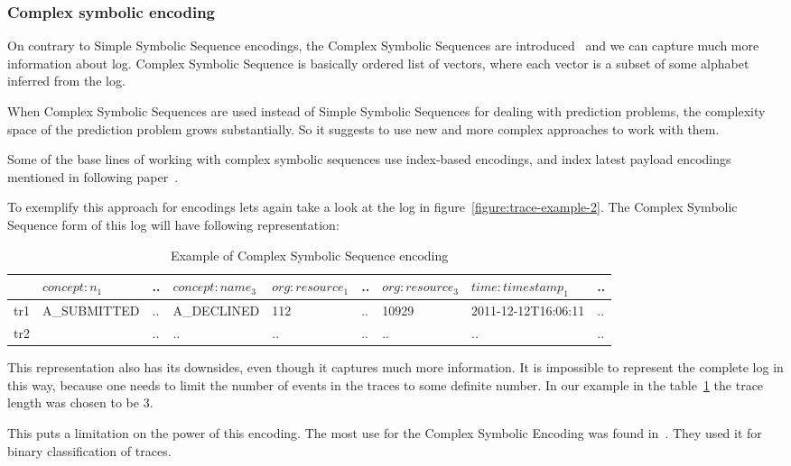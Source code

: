 \subsubsection{Complex symbolic encoding}

On contrary to Simple Symbolic Sequence encodings, the Complex Symbolic Sequences are introduced~\cite{Leontjeva2015} and we can capture much more information about log. Complex Symbolic Sequence is basically ordered list of vectors, where each vector is a subset of some alphabet inferred from the log.

When Complex Symbolic Sequences are used instead of Simple Symbolic Sequences for dealing with prediction problems, the complexity space of the prediction problem grows substantially. So it suggests to use new and more complex approaches to work with them.

Some of the base lines of working with complex symbolic sequences use index-based encodings, and index latest payload encodings mentioned in following paper~\cite{Leontjeva2015}.   

To exemplify this approach for encodings lets again take a look at the log in figure~\ref{figure:trace-example-2}. The Complex Symbolic Sequence form of this log will have following representation:

\begin{table}[h]
	\centering
	\begin{tabular}{| l | l | l | l | l | l | l | l | l |}
		\hline
		& $concept:n_{1}$ & .. & $concept:name_{3}$ & $org:resource_{1}$ & .. & $org:resource_{3}$ & $time:timestamp_{1}$ & .. \\	
		\hline
		tr1 & A\_SUBMITTED & .. & A\_DECLINED &  112 & .. & 10929 &  2011-12-12T16:06:11 & ..  \\
		tr2 &  & .. & .. & .. & .. & ..  & .. & ..  \\
		\hline
	\end{tabular}
	\caption{Example of Complex Symbolic Sequence encoding}
	\label{tab:complesymbseq_log_example}
\end{table}

This representation also has its downsides, even though it captures much more information. It is impossible to represent the complete log in this way, because one needs to limit the number of events in the traces to some definite number. In our example in the table~\ref{tab:complesymbseq_log_example} the trace length was chosen to be 3. 

This puts a limitation on the power of this encoding. The most use for the Complex Symbolic Encoding was found in~\cite{Leontjeva2015,Di-Francescomarino:2016aa,DBLP:conf/bpm/TeinemaaDMF16}. They used it for binary classification of traces. 



